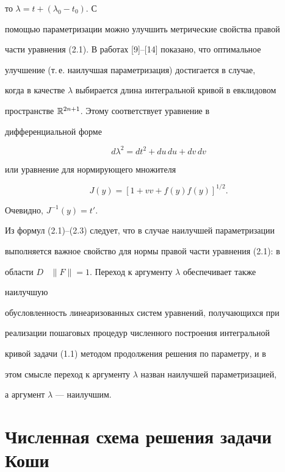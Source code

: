 то $\lambda=t+(\lambda_0-t_0)$. С 


помощью параметризации можно улучшить метрические свойства правой 


части уравнения (2.1). В работах [9]--[14] показано, что оптимальное 


улучшение (т.\,е. наилучшая параметризация) достигается в случае, 


когда в качестве $\lambda$ выбирается длина интегральной кривой в евклидовом 


пространстве $\Bbb R^{2n+1}$. Этому соответствует уравнение в 


дифференциальной форме 


\begin{equation} 


d\lambda^2=dt^2+du\,du+dv\,dv 


\end{equation} 


или уравнение для нормирующего множителя 


\begin{equation} 


J(y)=[1+vv+f(y)f(y)]^{1/2}. 


\end{equation} 


Очевидно, $J^{-1}(y)=t'$. 


 


Из формул (2.1)--(2.3) следует, что в случае наилучшей параметризации 


выполняется важное свойство для нормы правой части уравнения (2.1): в 


области $D$ \ $\|F\|=1$. Переход к аргументу $\lambda$ обеспечивает также 


наилучшую 


обусловленность линеаризованных систем уравнений, получающихся при 


реализации пошаговых процедур численного построения интегральной 


кривой задачи (1.1) методом продолжения решения по параметру, и в 


этом смысле переход к аргументу $\lambda$ назван наилучшей параметризацией, 


а аргумент $\lambda$ --- наилучшим. 


 


\section{Численная схема решения задачи Коши} 


